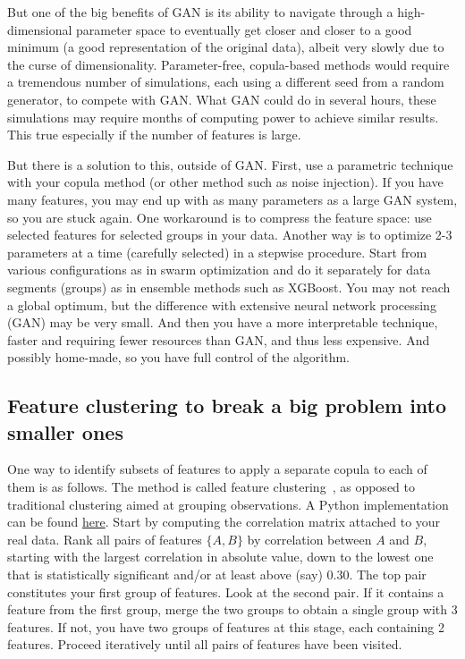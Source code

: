 \documentclass[oneside,10pt]{book}
\begin{document}
But one of the big benefits of GAN is its ability to navigate through a high-dimensional parameter space to eventually get closer and closer to a good minimum (a good representation of the original data), albeit very slowly due to the curse of dimensionality. Parameter-free, copula-based methods would require a tremendous number of simulations, each using a different seed from a random generator, to compete with GAN. What GAN could do in several hours, these simulations may require months of computing power to achieve similar results. This true especially if the number of features is large.

But there is a solution to this, outside of GAN. First, use a parametric technique with your copula method (or other method such as noise injection). If you have many features, you may end up with as many parameters as a large GAN system, so you are stuck again. One workaround is to compress the feature space: use selected features for selected groups in your data. Another way is to optimize 2-3 parameters at a time (carefully selected) in a stepwise procedure. Start from various configurations as in swarm optimization and do it separately for data segments (groups) as in ensemble methods such as XGBoost. You may not reach a global optimum, but the difference with extensive neural network processing (GAN) may be very small. And then you have a more interpretable technique, faster and requiring fewer resources than GAN, and thus less expensive. And possibly home-made, so you have full control of the algorithm.

\subsection{Feature clustering to break a big problem into smaller ones}\label{fcv34}

One way to identify subsets of features to apply a separate copula to each of them is as follows. The method
 is called \textcolor{index}{feature clustering}~\cite{fcnice}, as opposed 
to traditional clustering aimed at grouping observations. A Python implementation can be found \href{https://scikit-learn.org/stable/modules/generated/sklearn.cluster.FeatureAgglomeration.html}{here}.
Start by computing the correlation matrix
 attached to your real data. Rank all pairs of features $\{A, B\}$  by correlation between $A$ and $B$, starting with the largest correlation in absolute value, down to the lowest one that is statistically significant and/or at least above (say) $0.30$. 
The top pair constitutes your first group of features. Look at the second pair. If it contains a feature from the first group, merge the two groups to obtain a single group with 3 features. If not, you have two groups of features at this stage, each containing 2 features. Proceed iteratively until 
all pairs of features have been visited. 
\end{document}
